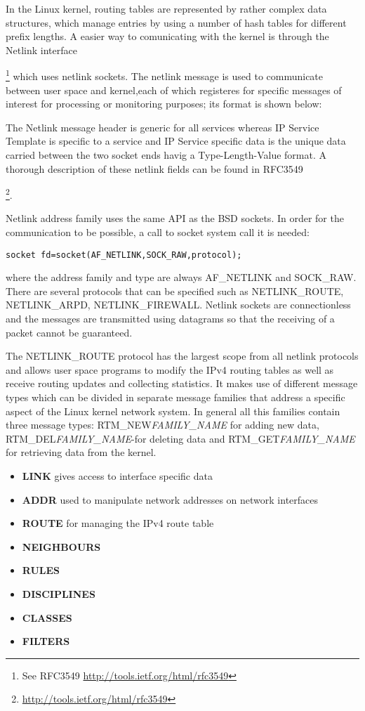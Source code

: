 In the Linux kernel, routing tables are represented by rather complex data structures, which manage entries by using a number of hash tables for different prefix lengths. A easier way to comunicating with the kernel is through the Netlink interface{\footnote{See RFC3549 \url{http://tools.ietf.org/html/rfc3549}} which uses netlink sockets.
The netlink message is used to communicate between user space and kernel,each of which registeres for specific messages of interest for processing or monitoring purposes; its format is shown below:

The Netlink message header is generic for all services whereas IP Service Template is specific to a service and IP Service specific data is the unique data carried between the two socket ends havig a Type-Length-Value format. A thorough description of these netlink fields can be found in RFC3549 {\footnote{\url{http://tools.ietf.org/html/rfc3549}}.

Netlink address family uses the same API as the BSD sockets. In order for the communication to be possible, a call to socket system call it is needed:
\begin{lstlisting}
socket fd=socket(AF_NETLINK,SOCK_RAW,protocol);
\end{lstlisting}
where the address family and type are always AF_NETLINK and SOCK_RAW. There are several protocols that can be specified such as NETLINK_ROUTE, NETLINK_ARPD, NETLINK_FIREWALL.
Netlink sockets are connectionless and the messages are transmitted using datagrams so that the receiving of a packet cannot be guaranteed.

The NETLINK_ROUTE protocol has the largest scope from all netlink protocols and allows user space programs to modify the IPv4 routing tables as well as receive routing updates and collecting statistics. It makes use of  different message types which can be divided in separate message families that address a specific aspect of the Linux kernel network system. In general all this families contain three message types: RTM_NEW\textit{FAMILY_NAME} for adding new data, RTM_DEL\textit{FAMILY_NAME}-for deleting data and RTM_GET\textit{FAMILY_NAME} for retrieving data from the kernel.
\begin{itemize}
\item{\bf LINK} gives access to interface specific data
\item{\bf ADDR} used to manipulate network addresses on network interfaces
\item{\bf ROUTE} for managing the IPv4 route table
\item{\bf NEIGHBOURS}
\item{\bf RULES}
\item{\bf DISCIPLINES}
\item{\bf CLASSES}
\item{\bf FILTERS}
\end{itemize} 

}}
